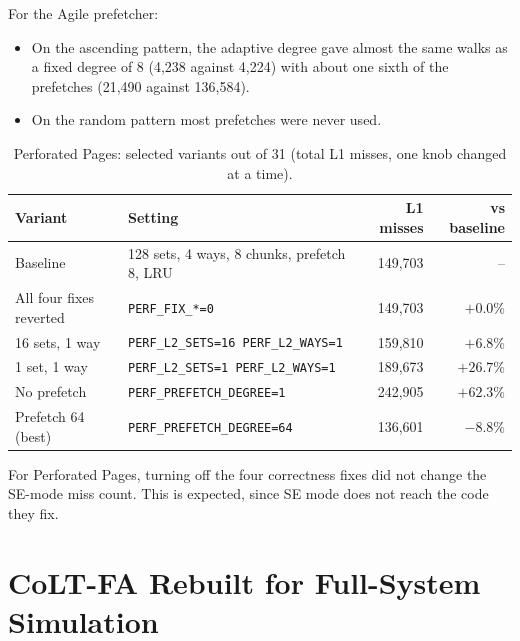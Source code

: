 \noindent For the Agile prefetcher:
\begin{itemize}
    \item On the ascending pattern, the adaptive degree gave almost the same walks as a fixed degree of 8 (4,238 against 4,224) with about one sixth of the prefetches (21,490 against 136,584).
    \item On the random pattern most prefetches were never used.
\end{itemize}

\begin{table}[htbp]
\centering
\small
\caption{Perforated Pages: selected variants out of 31 (total L1 misses, one knob changed at a time).}
\label{tab:sweep_perf}
\begin{tabular}{l l r r}
\toprule
\textbf{Variant} & \textbf{Setting} & \textbf{L1 misses} & \textbf{vs baseline} \\
\midrule
Baseline & 128 sets, 4 ways, 8 chunks, prefetch 8, LRU & 149,703 & -- \\
All four fixes reverted & \texttt{PERF\_FIX\_*=0} & 149,703 & $+0.0\%$ \\
16 sets, 1 way & \texttt{PERF\_L2\_SETS=16 PERF\_L2\_WAYS=1} & 159,810 & $+6.8\%$ \\
1 set, 1 way & \texttt{PERF\_L2\_SETS=1 PERF\_L2\_WAYS=1} & 189,673 & $+26.7\%$ \\
No prefetch & \texttt{PERF\_PREFETCH\_DEGREE=1} & 242,905 & $+62.3\%$ \\
Prefetch 64 (best) & \texttt{PERF\_PREFETCH\_DEGREE=64} & 136,601 & $-8.8\%$ \\
\bottomrule
\end{tabular}
\end{table}

\noindent For Perforated Pages, turning off the four correctness fixes did not change the SE-mode miss count. This is expected, since SE mode does not reach the code they fix.

\section{CoLT-FA Rebuilt for Full-System Simulation}
\label{sec:colt_fs}

